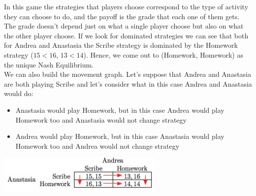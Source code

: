 \documentclass{article}
\begin{document}
In this game the strategies that players choose correspond to the type of activity they can choose to do, and the payoff is the grade that each one of them gets. The grade doesn't depend just on what a single player choose but also on what the other player choose. If we look for dominated strategies we can see that both for Andrea and Anastasia the Scribe strategy is dominated by the Homework strategy ($15<16$, $13<14$). Hence, we come out to (Homework, Homework) as the unique Nash Equilibrium.\\
We can also build the movement graph. Let's suppose that Andrea and Anastasia are both playing Scribe and let's consider what in this case Andrea and Anastasia would do: 
\begin{itemize}
	\item Anastasia would play Homework, but in this case Andrea would play Homework too and Anastasia would not change strategy 
	\item Andrea would play Homework, but in this case Anastasia would play Homework too and Andrea would not change strategy 
\end{itemize}

\centerline{
\includegraphics[width=230pt]{img5.jpg}}
\end{document}
